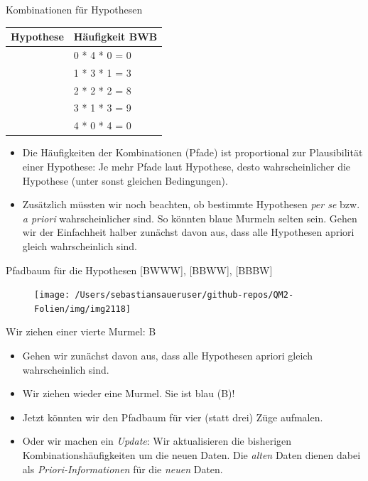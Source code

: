 \documentclass[
  ngerman,
  ignorenonframetext,
]{beamer}
\providecommand{\tightlist}{%
  \setlength{\itemsep}{0pt}\setlength{\parskip}{0pt}}
\begin{document}
\begin{frame}{Kombinationen für Hypothesen}
\protect\hypertarget{kombinationen-fuxfcr-hypothesen}{}
\begin{tabular}{l|l}
\hline
Hypothese & Häufigkeit BWB\\
\hline
[W W W W] & 0 * 4 * 0 = 0\\
\hline
[B W W W] & 1 * 3 * 1 = 3\\
\hline
[B B W W] & 2 * 2 * 2 = 8\\
\hline
[B B B W] & 3 * 1 * 3 = 9\\
\hline
[B B B B] & 4 * 0 * 4 = 0\\
\hline
\end{tabular}

\begin{itemize}
\item
  Die Häufigkeiten der Kombinationen (Pfade) ist proportional zur
  Plausibilität einer Hypothese: Je mehr Pfade laut Hypothese, desto
  wahrscheinlicher die Hypothese (unter sonst gleichen Bedingungen).
\item
  Zusätzlich müssten wir noch beachten, ob bestimmte Hypothesen
  \emph{per se} bzw. \emph{a priori} wahrscheinlicher sind. So könnten
  blaue Murmeln selten sein. Gehen wir der Einfachheit halber zunächst
  davon aus, dass alle Hypothesen apriori gleich wahrscheinlich sind.
\end{itemize}
\end{frame}

\begin{frame}{Pfadbaum für die Hypothesen {[}BWWW{]}, {[}BBWW{]},
{[}BBBW{]}}
\protect\hypertarget{pfadbaum-fuxfcr-die-hypothesen-bwww-bbww-bbbw}{}
\begin{figure}[H]
\texttt{[image: /Users/sebastiansaueruser/github-repos/QM2-Folien/img/img2118]} \end{figure}
\end{frame}

\begin{frame}{Wir ziehen einer vierte Murmel: B}
\protect\hypertarget{wir-ziehen-einer-vierte-murmel-b}{}
\begin{itemize}
\tightlist
\item
  Gehen wir zunächst davon aus, dass alle Hypothesen apriori gleich
  wahrscheinlich sind.
\item
  Wir ziehen wieder eine Murmel. Sie ist blau (B)!
\item
  Jetzt könnten wir den Pfadbaum für vier (statt drei) Züge aufmalen.
\item
  Oder wir machen ein \emph{Update}: Wir aktualisieren die bisherigen
  Kombinationshäufigkeiten um die neuen Daten. Die \emph{alten} Daten
  dienen dabei als \emph{Priori-Informationen} für die \emph{neuen}
  Daten.
\end{itemize}
\end{frame}
\end{document}
